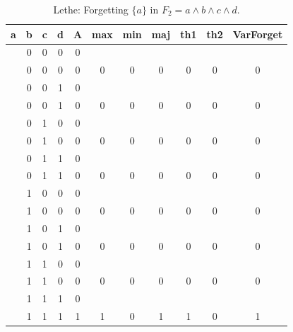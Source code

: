 \begin{table}[!tb]
    \centering
    \begin{tabular}{|c|c|c|c|c|c|c|c|c|c|c|}
        \hline
        \textbf{a} & \textbf{b} & \textbf{c} & \textbf{d} & \textbf{A} & \textbf{max} & \textbf{min} & \textbf{maj} & \textbf{th1} & \textbf{th2} & \textbf{VarForget} \\ \hline
        \rowcolor{gray!40}  & 0 & 0 & 0 & 0 &  &  &  &  &  &  \\ \hline
        \rowcolor{gray!40}  & 0 & 0 & 0 & 0 & 0 & 0 & 0 & 0 & 0 & 0 \\ \hline
        \rowcolor{blue!40}  & 0 & 0 & 1 & 0 &  &  &  &  &  &  \\ \hline
        \rowcolor{blue!40}  & 0 & 0 & 1 & 0 & 0 & 0 & 0 & 0 & 0 & 0 \\ \hline
        \rowcolor{red!40}  & 0 & 1 & 0 & 0 &  &  &  &  &  &  \\ \hline
        \rowcolor{red!40}  & 0 & 1 & 0 & 0 & 0 & 0 & 0 & 0 & 0 & 0 \\ \hline
        \rowcolor{green!40}  & 0 & 1 & 1 & 0 &  &  &  &  &  &  \\ \hline
        \rowcolor{green!40}  & 0 & 1 & 1 & 0 & 0 & 0 & 0 & 0 & 0 & 0 \\ \hline
        \rowcolor{yellow!40}  & 1 & 0 & 0 & 0 &  &  &  &  &  &  \\ \hline
        \rowcolor{yellow!40}  & 1 & 0 & 0 & 0 & 0 & 0 & 0 & 0 & 0 & 0 \\ \hline
        \rowcolor{gray!40}  & 1 & 0 & 1 & 0 &  &  &  &  &  &  \\ \hline
        \rowcolor{gray!40}  & 1 & 0 & 1 & 0 & 0 & 0 & 0 & 0 & 0 & 0 \\ \hline
        \rowcolor{blue!40}  & 1 & 1 & 0 & 0 &  &  &  &  &  &  \\ \hline
        \rowcolor{blue!40}  & 1 & 1 & 0 & 0 & 0 & 0 & 0 & 0 & 0 & 0 \\ \hline
        \rowcolor{red!40}  & 1 & 1 & 1 & 0 &  &  &  &  &  &  \\ \hline
        \rowcolor{red!40}  & 1 & 1 & 1 & 1 & 1 & 0 & 1 & 1 & 0 & 1 \\ \hline
    \end{tabular}
    \caption{Lethe: Forgetting $\{a\}$ in $F_{2} = a \land b \land c \land d$.}
    \label{tab:lethe-F2-a}
\end{table}
